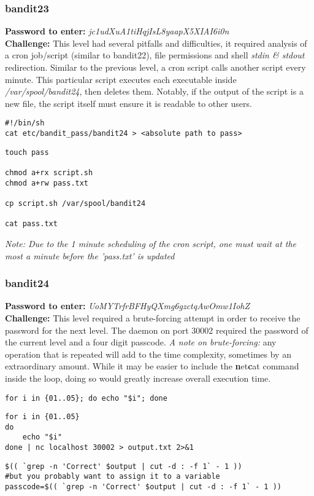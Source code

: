 \documentclass[a4paper]{article}
\newcommand{\pass}[1]{\textbf{Password to enter:} \textit{#1}\\}
\newcommand{\chall}{\textbf{Challenge:} }
\begin{document}
\subsubsection{bandit23}
\pass{jc1udXuA1tiHqjIsL8yaapX5XIAI6i0n}
\chall This level had several pitfalls and difficulties, it required analysis of a cron job/script (similar to bandit22), file permissions and shell \textit{stdin \& stdout} redirection. Similar to the previous level, a cron script calls another script every minute. This particular script executes each executable inside \textit{/var/spool/bandit24}, then deletes them. Notably, if the output of the script is a new file, the script itself must ensure it is readable to other users.
\begin{lstlisting}[title=script.sh]
#!/bin/sh
cat etc/bandit_pass/bandit24 > <absolute path to pass>
\end{lstlisting}
\begin{lstlisting}
touch pass

chmod a+rx script.sh
chmod a+rw pass.txt

cp script.sh /var/spool/bandit24

cat pass.txt
\end{lstlisting}
\textit{Note: Due to the 1 minute scheduling of the cron script, one must wait at the most a minute before the 'pass.txt' is updated}

\subsubsection{bandit24}
\pass{UoMYTrfrBFHyQXmg6gzctqAwOmw1IohZ}
\chall This level required a brute-forcing attempt in order to receive the password for the next level. The daemon on port 30002 required the password of the current level and a four digit passcode.
\textit{A note on brute-forcing:} any operation that is repeated will add to the time complexity, sometimes by an extraordinary amount. While it may be easier to include the \textbf{n}et\textbf{c}at command inside the loop, doing so would greatly increase overall execution time.
\begin{lstlisting}[title=one line for loops in bash]
for i in {01..05}; do echo "$i"; done
\end{lstlisting}
\begin{lstlisting}[title=you can pipe the output of a for loop]
for i in {01..05}
do
	echo "$i"
done | nc localhost 30002 > output.txt 2>&1
\end{lstlisting}
\begin{lstlisting}[title=using grep line numbers combined with bash math]
$(( `grep -n 'Correct' $output | cut -d : -f 1` - 1 ))
#but you probably want to assign it to a variable
passcode=$(( `grep -n 'Correct' $output | cut -d : -f 1` - 1 ))
\end{lstlisting}
\end{document}
